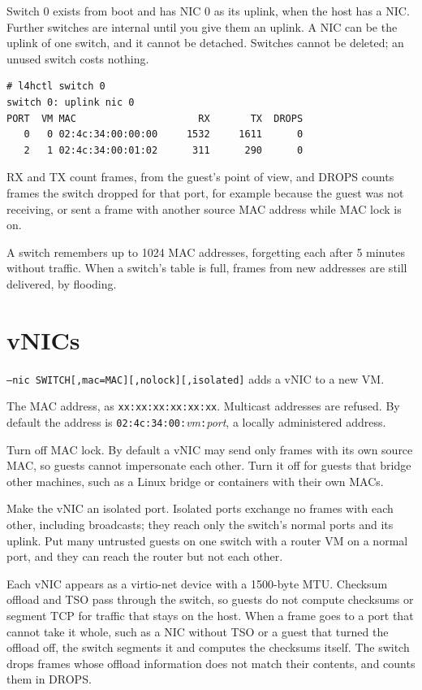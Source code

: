 \documentclass[11pt,a4paper]{report}
\begin{document}
Switch 0 exists from boot and has NIC 0 as its uplink, when the host has a
NIC. Further switches are internal until you give them an uplink. A NIC can be
the uplink of one switch, and it cannot be detached. Switches cannot be
deleted; an unused switch costs nothing.

\begin{lstlisting}
# l4hctl switch 0
switch 0: uplink nic 0
PORT  VM MAC                     RX       TX  DROPS
   0   0 02:4c:34:00:00:00     1532     1611      0
   2   1 02:4c:34:00:01:02      311      290      0
\end{lstlisting}
RX and TX count frames, from the guest's point of view, and DROPS counts
frames the switch dropped for that port, for example because the guest was
not receiving, or sent a frame with another source MAC address while MAC
lock is on.

A switch remembers up to 1024 MAC addresses, forgetting each after 5
minutes without traffic. When a switch's table is full, frames from new
addresses are still delivered, by flooding.

\section{vNICs}

\texttt{--nic SWITCH[,mac=MAC][,nolock][,isolated]} adds a vNIC to a new VM.

\begin{description}[style=nextline]
  \item[\texttt{mac=MAC}] The MAC address, as
    \texttt{xx:xx:xx:xx:xx:xx}. Multicast addresses are refused. By default
    the address is \texttt{02:4c:34:00:}\textit{vm}\texttt{:}\textit{port},
    a locally administered address.
  \item[\texttt{nolock}] Turn off MAC lock. By default a vNIC may send only
    frames with its own source MAC, so guests cannot impersonate each other.
    Turn it off for guests that bridge other machines, such as a Linux
    bridge or containers with their own MACs.
  \item[\texttt{isolated}] Make the vNIC an isolated port. Isolated ports
    exchange no frames with each other, including broadcasts; they reach
    only the switch's normal ports and its uplink. Put many untrusted
    guests on one switch with a router VM on a normal port, and they can
    reach the router but not each other.
\end{description}

Each vNIC appears as a virtio-net device with a 1500-byte MTU. Checksum
offload and TSO pass through the switch, so guests do not compute checksums
or segment TCP for traffic that stays on the host. When a frame goes to a
port that cannot take it whole, such as a NIC without TSO or a guest that
turned the offload off, the switch segments it and computes the checksums
itself. The switch drops frames whose offload information does not match
their contents, and counts them in DROPS.
\end{document}
